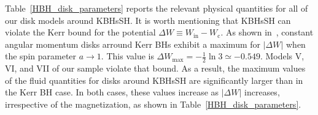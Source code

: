 \documentclass[twocolumn,aps,showpacs,showkeys,prd,superscriptaddress,byrevtex, amsmath]{revtex4-1}
\begin{document}
Table~\ref{HBH_disk_parameters} reports the relevant physical quantities for all of our disk models around KBHsSH. It is worth mentioning that KBHsSH can violate the Kerr bound for the potential $\Delta W \equiv W_{\mathrm{in}} - W_{\mathrm{c}}$. As shown in~\cite{Abramowicz:1978}, constant angular momentum disks arround Kerr BHs exhibit a maximum for $|\Delta W|$ when the spin parameter $a\rightarrow 1$. This value is $\Delta W_{\mathrm{max}} = -\frac{1}{2} \ln 3 \simeq -0.549$. Models V, VI, and VII of our sample violate that bound. As a result, the maximum values of the fluid quantities for disks around KBHsSH are significantly larger than in the Kerr BH case. In both cases, these values increase as $|\Delta W|$ increases, irrespective of the magnetization, as shown in Table~\ref{HBH_disk_parameters}.


\end{document}
